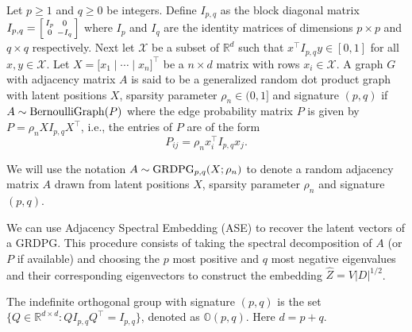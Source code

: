 \documentclass[12pt]{article}
\begin{document}
\begin{definition}
\label{grdpg}
Let $p \geq 1$ and $q \geq 0$ be integers. Define $I_{p,q}$ as the
block diagonal matrix $I_{p,q} = \Bigl[\begin{smallmatrix} I_{p} & 0
  \\ 0 & - I_{q} \end{smallmatrix} \Bigr]$ where $I_{p}$ and $I_{q}$
are the identity matrices of dimensions $p \times p$ and $q \times q$
respectively. Next let $\mathcal{X}$ be a subset of $\mathbb{R}^{d}$
such that $x^{\top} I_{p,q} y \in [0,1]$ for all $x,y \in
\mathcal{X}$. Let $X = \bigl[x_1 \mid \cdots \mid x_n\bigr]^{\top}$ be
a $n \times d$ matrix with rows $x_i \in \mathcal{X}$. A graph $G$
with adjacency matrix $A$ is said to be a generalized random dot
product graph with latent positions $X$, sparsity parameter $\rho_n
\in (0,1]$
and signature $(p,q)$ if $A \sim \mathrm{BernoulliGraph}(P)$ where the edge probability
matrix $P$ is given
by $P = \rho_n X I_{p,q} X^{\top}$, i.e., the entries of $P$ are of
the form
$$P_{ij} = \rho_n x_i^{\top} I_{p,q} x_j.$$
\end{definition}
We will use the notation \(A \sim \mathrm{GRDPG}_{p,q}(X;\rho_n)\) to denote a random
adjacency matrix \(A\) drawn from latent positions \(X\), sparsity
parameter $\rho_n$ and signature
\((p, q)\). %
\begin{remark}
  \label{rem:ase}
We can use Adjacency Spectral Embedding (ASE) 
\citep{doi:10.1080/01621459.2012.699795} to recover the latent vectors of a GRDPG. 
This procedure consists of taking the spectral decomposition of $A$ 
(or $P$ if available) and choosing the $p$ most positive and $q$ most negative
eigenvalues and their corresponding eigenvectors 
to construct the embedding $\hat{Z} = V |D|^{1/2}$. 
\end{remark}

\begin{definition}
The indefinite orthogonal group with signature $(p, q)$ is
the set $\{Q \in \mathbb{R}^{d \times d} \colon Q I_{p, q} Q^{\top} = I_{p, q}\}$,
denoted as $\mathbb{O}(p, q)$. Here $d = p + q$. 
\end{definition}
\end{document}
